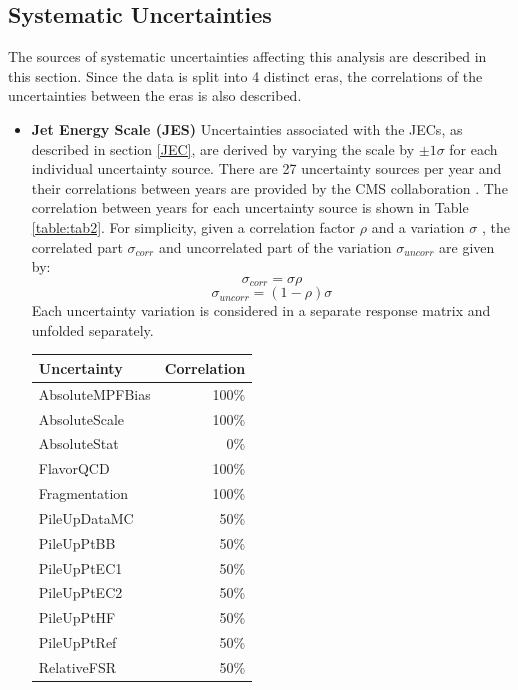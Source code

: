 \subsection{Systematic Uncertainties}
The sources of systematic uncertainties affecting this analysis are described in this section. Since the data is split into 4 distinct eras, the correlations of the uncertainties between the eras is also described.
\begin{itemize}
\item \textbf{Jet Energy Scale (JES)} Uncertainties associated with the JECs, as described in section \ref{JEC}, are derived by varying the scale by $\pm 1 \sigma$ for each individual uncertainty source. There are 27 uncertainty sources per year and their correlations between years are provided by the CMS collaboration \cite{JEC}. The correlation between years for each uncertainty source is shown in Table \ref{table:tab2}. For simplicity, given a correlation factor $\rho$ and a variation $\sigma$ , the correlated part $\sigma_{corr}$ and uncorrelated part of the variation $\sigma_{uncorr}$ are given by:
  \begin{equation}
    \label{eq:corr}
    \sigma_{corr}=\sigma\rho
  \end{equation}
    \begin{equation}
    \label{eq:uncorr}
    \sigma_{uncorr}=(1-\rho)\sigma
  \end{equation}
  Each uncertainty variation is considered in a separate response matrix and unfolded separately.
  \begin{table}[h!]
    \centering
    \begin{tabular}{lr}
      \hline
      Uncertainty & Correlation \\ \hline
      AbsoluteMPFBias & 100\% \\
      AbsoluteScale & 100\% \\
      AbsoluteStat & 0\% \\
      FlavorQCD & 100\% \\
      Fragmentation & 100\% \\
      PileUpDataMC & 50\% \\
      PileUpPtBB & 50\% \\
      PileUpPtEC1 &50\% \\
      PileUpPtEC2 & 50\% \\
      PileUpPtHF & 50\% \\
      PileUpPtRef & 50\% \\
      RelativeFSR & 50\% \\

\end{tabular}
\end{table}
\end{itemize}
